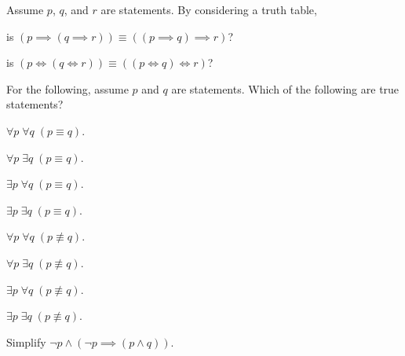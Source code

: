 \begin{problem}
    Assume $p$, $q$, and $r$ are statements. By considering a truth table,
    \begin{partquestions}{\alph*}
        \item is $(p \implies (q \implies r)) \equiv ((p \implies q) \implies r)$?
        \item is $(p \iff (q \iff r)) \equiv ((p \iff q) \iff r)$?
    \end{partquestions}
\end{problem}

\begin{problem}
    For the following, assume $p$ and $q$ are statements. Which of the following are true statements?
    \begin{multicols}{2}
        \begin{partquestions}{\alph*}
            \item $\forall p\; \forall q\; (p \equiv q)$.
            \item $\forall p\; \exists q\; (p \equiv q)$.
            \item $\exists p\; \forall q\; (p \equiv q)$.
            \item $\exists p\; \exists q\; (p \equiv q)$.
            \item $\forall p\; \forall q\; (p \not\equiv q)$.
            \item $\forall p\; \exists q\; (p \not\equiv q)$.
            \item $\exists p\; \forall q\; (p \not\equiv q)$.
            \item $\exists p\; \exists q\; (p \not\equiv q)$.
        \end{partquestions}
    \end{multicols}
\end{problem}

\begin{problem}
    Simplify $\lnot p \land (\lnot p \implies (p \land q))$.
\end{problem}
